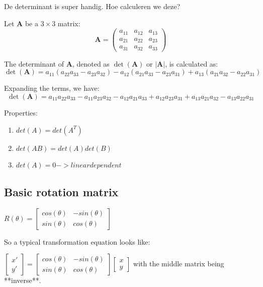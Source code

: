 \documentclass[a4paper]{article}
\begin{document}
De determinant is super handig. Hoe calculeren we deze?

Let \(\mathbf{A}\) be a \(3 \times 3\) matrix:
\[
	\mathbf{A} =
	\begin{pmatrix}
		a_{11} & a_{12} & a_{13} \\
		a_{21} & a_{22} & a_{23} \\
		a_{31} & a_{32} & a_{33}
	\end{pmatrix}
\]

The determinant of \(\mathbf{A}\), denoted as \(\det(\mathbf{A})\) or \(|\mathbf{A}|\), is calculated as:
\[
	\det(\mathbf{A}) = a_{11}(a_{22}a_{33} - a_{23}a_{32}) - a_{12}(a_{21}a_{33} - a_{23}a_{31}) + a_{13}(a_{21}a_{32} - a_{22}a_{31})
\]

Expanding the terms, we have:
\[
	\det(\mathbf{A}) = a_{11}a_{22}a_{33} - a_{11}a_{23}a_{32} - a_{12}a_{21}a_{33} + a_{12}a_{23}a_{31} + a_{13}a_{21}a_{32} - a_{13}a_{22}a_{31}
\]

Properties:

\begin{enumerate}
	\item $det(A) = det(A^T)$
	\item $det(AB) = det(A) det(B)$
	\item $det(A) = 0 -> linear dependent$
\end{enumerate}

\subsection{Basic rotation matrix}

$R(\theta) = \begin{bmatrix} cos(\theta) & -sin(\theta) \\ sin(\theta) & cos(\theta) \end{bmatrix}$

So a typical transformation equation looks like:

$\begin{bmatrix} x' \\ y' \end{bmatrix} = \begin{bmatrix} cos(\theta) & -sin(\theta) \\ sin(\theta) & cos(\theta) \end{bmatrix} \begin{bmatrix} x \\ y \end{bmatrix}$
with the middle matrix being **inverse**.
\end{document}
